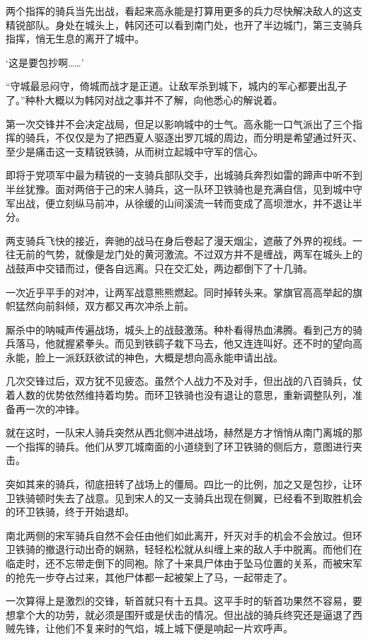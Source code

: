 两个指挥的骑兵当先出战，看起来高永能是打算用更多的兵力尽快解决敌人的这支精锐部队。身处在城头上，韩冈还可以看到南门处，也开了半边城门，第三支骑兵指挥，悄无生息的离开了城中。

‘这是要包抄啊……’

“守城最忌闷守，倚城而战才是正道。让敌军杀到城下，城内的军心都要出乱子了。”种朴大概以为韩冈对战之事并不了解，向他悉心的解说着。

第一次交锋并不会决定战局，但足以影响城中的士气。高永能一口气派出了三个指挥的骑兵，不仅仅是为了把西夏人驱逐出罗兀城的周边，而分明是希望通过歼灭、至少是痛击这一支精锐铁骑，从而树立起城中守军的信心。

即将于党项军中最为精锐的一支骑兵部队交手，出城骑兵奔烈如雷的蹄声中听不到半丝犹豫。面对两倍于己的宋人骑兵，这一队环卫铁骑也是充满自信，见到城中守军出战，便立刻纵马前冲，从徐缓的山间溪流一转而变成了高坝泄水，并不退让半分。

两支骑兵飞快的接近，奔驰的战马在身后卷起了漫天烟尘，遮蔽了外界的视线。一往无前的气势，就像是龙门处的黄河激流。不过双方并不是缠战，两军在城头上的战鼓声中交错而过，便各自远离。只在交汇处，两边都倒下了十几骑。

一次近乎平手的对冲，让两军战意熊熊燃起。同时掉转头来。掌旗官高高举起的旗帜猛然向前斜倾，双方都又再次冲杀上前。

厮杀中的呐喊声传遍战场，城头上的战鼓激荡。种朴看得热血沸腾。看到己方的骑兵落马，他就握紧拳头。而见到铁鹞子栽下马去，他又连连叫好。还不时的望向高永能，脸上一派跃跃欲试的神色，大概是想向高永能申请出战。

几次交锋过后，双方犹不见疲态。虽然个人战力不及对手，但出战的八百骑兵，仗着人数的优势依然维持着均势。而环卫铁骑也没有退让的意思，重新调整队列，准备再一次的冲锋。

就在这时，一队宋人骑兵突然从西北侧冲进战场，赫然是方才悄悄从南门离城的那一个指挥的骑兵。他们从罗兀城南面的小道绕到了环卫铁骑的侧后方，意图进行夹击。

突如其来的骑兵，彻底扭转了战场上的僵局。四比一的比例，加之又是包抄，让环卫铁骑顿时失去了战意。见到宋人的又一支骑兵出现在侧翼，已经看不到取胜机会的环卫铁骑，终于开始退却。

南北两侧的宋军骑兵自然不会任由他们如此离开，歼灭对手的机会不会放过。但环卫铁骑的撤退行动出奇的娴熟，轻轻松松就从纠缠上来的敌人手中脱离。而他们在临走时，还不忘带走倒下的同袍。除了十来具尸体由于坠马位置的关系，而被宋军的抢先一步夺占过来，其他尸体都一起被架上了马，一起带走了。

一次算得上是激烈的交锋，斩首就只有十五具。这平手时的斩首功果然不容易，要想拿个大的功劳，就必须是围歼或是伏击的情况。但出战的骑兵终究还是逼退了西贼先锋，让他们不复来时的气焰，城上城下便是响起一片欢呼声。

